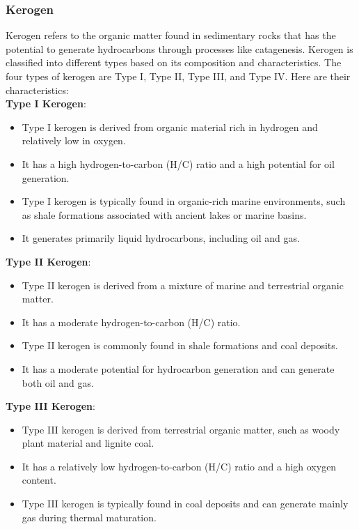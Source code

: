 \documentclass{article}
\begin{document}
\subsubsection*{Kerogen}
Kerogen refers to the organic matter found in sedimentary rocks that has the potential to generate hydrocarbons through processes like catagenesis. Kerogen is classified into different types based on its composition and characteristics. The four types of kerogen are Type I, Type II, Type III, and Type IV. Here are their characteristics:\\

\textbf{Type I Kerogen}:
    \begin{itemize}
        \item Type I kerogen is derived from organic material rich in hydrogen and relatively low in oxygen.
        \item It has a high hydrogen-to-carbon (H/C) ratio and a high potential for oil generation.
        \item Type I kerogen is typically found in organic-rich marine environments, such as shale formations associated with ancient lakes or marine basins.
        \item It generates primarily liquid hydrocarbons, including oil and gas.
    \end{itemize}

\textbf{Type II Kerogen}:
    \begin{itemize}
        \item Type II kerogen is derived from a mixture of marine and terrestrial organic matter.
        \item It has a moderate hydrogen-to-carbon (H/C) ratio.
        \item Type II kerogen is commonly found in shale formations and coal deposits.
        \item It has a moderate potential for hydrocarbon generation and can generate both oil and gas.
    \end{itemize}

\textbf{Type III Kerogen}:
    \begin{itemize}
        \item Type III kerogen is derived from terrestrial organic matter, such as woody plant material and lignite coal.
        \item It has a relatively low hydrogen-to-carbon (H/C) ratio and a high oxygen content.
        \item Type III kerogen is typically found in coal deposits and can generate mainly gas during thermal maturation.
    \end{itemize}
\end{document}
